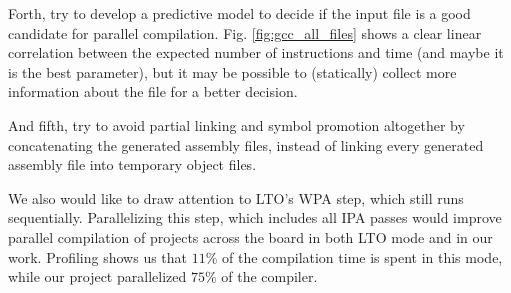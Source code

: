 \documentclass[runningheads]{llncs}
\begin{document}
Forth, try to develop a predictive model to decide if the input file is
a good candidate for parallel compilation. Fig. \ref{fig:gcc_all_files} shows
a clear linear correlation between the expected number of instructions and time
(and maybe it is the best parameter), but it may be possible to (statically)
collect more information about the file for a better decision.

And fifth, try to avoid partial linking and symbol promotion altogether
by concatenating the generated assembly files, instead of linking every
generated assembly file into temporary object files.

We also would like to draw attention to LTO's WPA step, which still runs
sequentially. Parallelizing this step, which includes all IPA passes would
improve parallel compilation of projects across the board in both LTO mode and
in our work. Profiling shows us that $11\%$ of the compilation time is spent in
this mode, while our project parallelized $75\%$ of the compiler.

%
%
%
% 
% 
%
%
%
%
%



\end{document}

